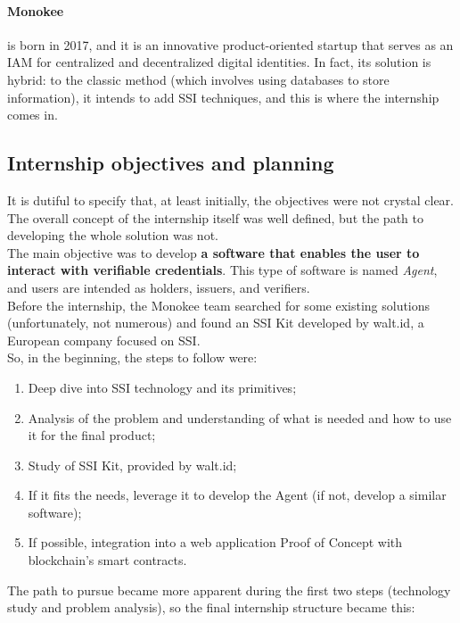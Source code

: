     \paragraph{Monokee} is born in 2017, and it is an innovative product-oriented 
    startup that serves as an IAM for centralized and decentralized digital 
    identities. In fact, its solution is hybrid: to the classic method (which 
    involves using databases to store information), it intends to add SSI techniques,
    and this is where the internship comes in.
\subsection{Internship objectives and planning}
It is dutiful to specify that, at least initially, the objectives were not crystal 
clear. The overall concept of the internship itself was well defined, but the path 
to developing the whole solution was not.\\
The main objective was to develop \textbf{a software that enables the user to interact 
with verifiable credentials}. This type of software is named \textit{Agent}, and 
users are intended as holders, issuers, and verifiers.\\
Before the internship, the Monokee team searched for some existing solutions 
(unfortunately, not numerous) and found an SSI Kit developed by walt.id, a European 
company focused on SSI.
\vspace*{0.3cm}\\
So, in the beginning, the steps to follow were:
\begin{enumerate}
    \item Deep dive into SSI technology and its primitives;
    \item Analysis of the problem and understanding of what is needed and how to use it
    for the final product;
    \item Study of SSI Kit, provided by walt.id;
    \item If it fits the needs, leverage it to develop the Agent (if not, develop
    a similar software);
    \item If possible, integration into a web application Proof of Concept with
    blockchain's smart contracts.
\end{enumerate}
\vspace*{0.3cm}
The path to pursue became more apparent during the first two steps (technology study 
and problem analysis), so the final internship structure became this:
